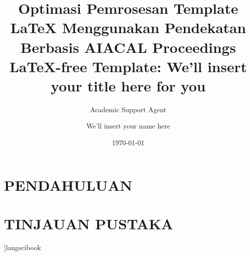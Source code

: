 \documentclass{langscibook}
\title{Optimasi Pemrosesan Template LaTeX Menggunakan Pendekatan Berbasis AI}
\author{Academic Support Agent}
\date{\today}
\begin{document}
\maketitle

\begin{abstract}

\end{abstract}

\chapter{PENDAHULUAN}


\chapter{TINJAUAN PUSTAKA}


]{langscibook}

\author{We'll insert your name here}

\title{ACAL Proceedings LaTeX-free Template: We'll insert your title here for you}  




%   
%    
\end{document}
